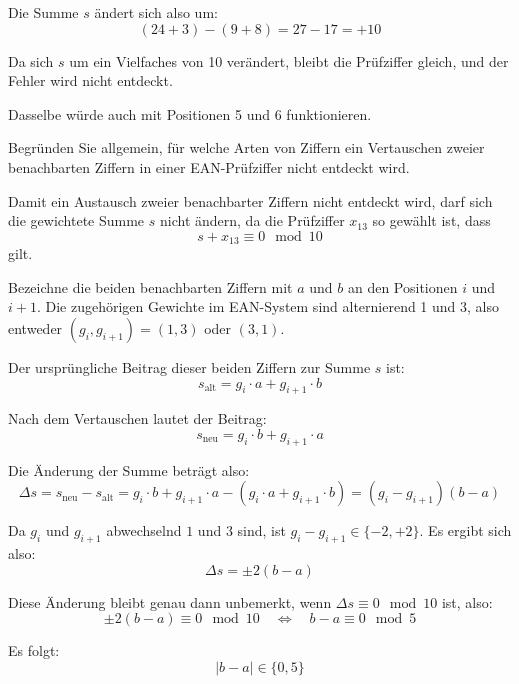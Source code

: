 \begin{myexercise}
\begin{myanswer}
        Die Summe $s$ ändert sich also um:
        \[
            (24 + 3) - (9 + 8) = 27 - 17 = +10
        \]

        Da sich $s$ um ein Vielfaches von 10 verändert, bleibt die Prüfziffer gleich, und der Fehler wird nicht entdeckt.

        Dasselbe würde auch mit Positionen 5 und 6 funktionieren.
    \end{myanswer}

    \begin{mychallenge}
        Begründen Sie allgemein, für welche Arten von Ziffern ein Vertauschen zweier benachbarten Ziffern in einer EAN-Prüfziffer nicht entdeckt wird.
        \begin{myanswer}
            Damit ein Austausch zweier benachbarter Ziffern nicht entdeckt wird, darf sich die gewichtete Summe $s$ nicht ändern, da die Prüfziffer $x_{13}$ so gewählt ist, dass
            \[
                s + x_{13} \equiv 0 \mod 10
            \]
            gilt.

            Bezeichne die beiden benachbarten Ziffern mit $a$ und $b$ an den Positionen $i$ und $i+1$. Die zugehörigen Gewichte im EAN-System sind alternierend 1 und 3, also entweder $(g_i, g_{i+1}) = (1, 3)$ oder $(3, 1)$.

            Der ursprüngliche Beitrag dieser beiden Ziffern zur Summe $s$ ist:
            \[
                s_\text{alt} = g_i \cdot a + g_{i+1} \cdot b
            \]

            Nach dem Vertauschen lautet der Beitrag:
            \[
                s_\text{neu} = g_i \cdot b + g_{i+1} \cdot a
            \]

            Die Änderung der Summe beträgt also:
            \[
                \Delta s = s_\text{neu} - s_\text{alt} = g_i \cdot b + g_{i+1} \cdot a - (g_i \cdot a + g_{i+1} \cdot b)
                = (g_i - g_{i+1})(b - a)
            \]

            Da $g_i$ und $g_{i+1}$ abwechselnd $1$ und $3$ sind, ist $g_i - g_{i+1} \in \{-2, +2\}$. Es ergibt sich also:
            \[
                \Delta s = \pm 2 (b - a)
            \]

            Diese Änderung bleibt genau dann unbemerkt, wenn $\Delta s \equiv 0 \mod 10$ ist, also:
            \[
                \pm 2(b - a) \equiv 0 \mod 10 \quad \Leftrightarrow \quad b - a \equiv 0 \mod 5
            \]

            Es folgt:
            \[
                |b - a| \in \{0, 5\}
            \]


\end{myanswer}
\end{mychallenge}
\end{myexercise}

